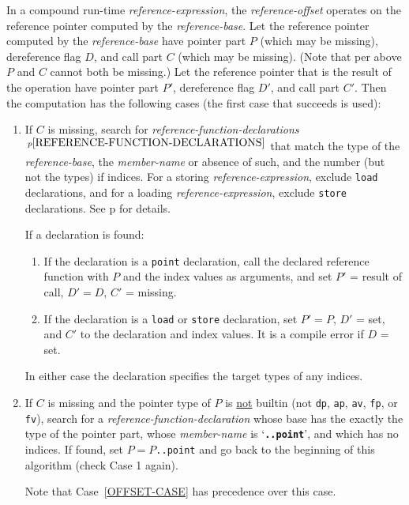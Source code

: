 \documentclass[12pt]{article}
\newcommand{\TT}[1]{{\tt \bfseries #1}}
\newcommand{\pagref}[1]{p\pageref{#1}}
\newcommand{\pagnote}[1]{$\,^{p\pageref{#1}}$}
\begin{document}
In a compound run-time {\em reference-expression}, the
{\em reference-offset} operates on the reference pointer
computed by the {\em reference-base}.  Let the reference pointer
computed by the {\em reference-base} have pointer part $P$ (which
may be missing), dereference flag $D$, and call part $C$ (which
may be missing).  (Note that per above $P$ and $C$ cannot both be
missing.)  Let the reference pointer that is the result of
the operation have pointer part $P'$,
dereference flag $D'$, and call part $C'$.  Then the computation has
the following cases (the first case that
succeeds is used):\label{RUN-TIME-FIELD-SELECTION}
\begin{enumerate}

\item\label{OFFSET-CASE}
If $C$ is missing, search for {\em reference-function-declarations}%
\pagnote{REFERENCE-FUNCTION-DECLARATIONS} that match the type of
the {\em reference-base}, the {\em member-name} or absence of such,
and the number (but not the types) if indices.  For a storing
{\em reference-expression}, exclude {\tt load} declarations, and
for a loading {\em reference-expression}, exclude {\tt store}
declarations.  See
\pagref{REFERENCE-CALL-REFERENCE-DECLARATION-OFFSET-MATCHING} for details.

If a declaration is found:
\begin{enumerate}
\item
If the declaration is a {\tt point} declaration, call the declared
reference function with $P$ and the index values as arguments,
and set $P'$ = result of call, $D' = D$, $C'$ = missing.
\item
If the declaration is a {\tt load} or {\tt store} declaration,
set $P' = P$, $D'$ = set, and $C'$ to the declaration and index values.
It is a compile error if $D$ = set.
\end{enumerate}
In either case the declaration specifies the target types of any indices.

\item\label{POINT-CASE}
If $C$ is missing and the pointer type of $P$ is \underline{not} builtin
(not {\tt dp}, {\tt ap}, {\tt av}, {\tt fp}, or {\tt fv}),
search for a {\em reference-function-declaration}
whose base has the exactly the type of the pointer part, whose
{\em member-name} is `\TT{..point}', and which has no indices.
If found, set $P=P${\tt ..point} and go back to the beginning
of this algorithm (check Case 1 again).

Note that Case~\ref{OFFSET-CASE} has precedence over this case.


\end{enumerate}
\end{document}

